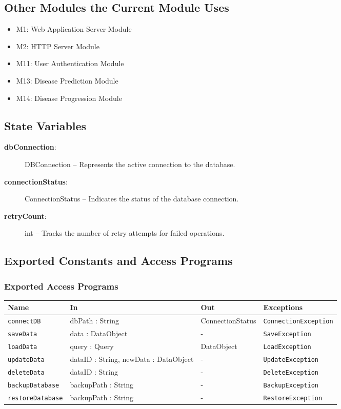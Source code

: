 \documentclass[12pt, titlepage]{article}
\begin{document}
\subsection{Other Modules the Current Module Uses}
\begin{itemize}
    \item M1: Web Application Server Module
    \item M2: HTTP Server Module
    \item M11: User Authentication Module
    \item M13: Disease Prediction Module 
    \item M14: Disease Progression Module
\end{itemize}

\subsection{State Variables}
\begin{description}
    \item[\textbf{dbConnection}:] DBConnection -- Represents the active connection to the database.
    \item[\textbf{connectionStatus}:] ConnectionStatus -- Indicates the status of the database connection.
    \item[\textbf{retryCount}:] int -- Tracks the number of retry attempts for failed operations.
\end{description}

\subsection{Exported Constants and Access Programs}

\subsubsection{Exported Access Programs}
\begin{center}
  \begin{tabular}{|l|l|l|l|}
    \hline
    \textbf{Name} & \textbf{In} & \textbf{Out} & \textbf{Exceptions} \\
    \hline 
    \texttt{connectDB} & dbPath : String & ConnectionStatus & \texttt{ConnectionException} \\
    \hline
    \texttt{saveData} & data : DataObject & - & \texttt{SaveException} \\
    \hline
    \texttt{loadData} & query : Query & DataObject & \texttt{LoadException} \\
    \hline
    \texttt{updateData} & dataID : String, newData : DataObject & - & \texttt{UpdateException} \\
    \hline
    \texttt{deleteData} & dataID : String & - & \texttt{DeleteException} \\
    \hline
    \texttt{backupDatabase} & backupPath : String & - & \texttt{BackupException} \\
    \hline
    \texttt{restoreDatabase} & backupPath : String & - & \texttt{RestoreException} \\
    \hline
  \end{tabular}
\end{center}
\end{document}

